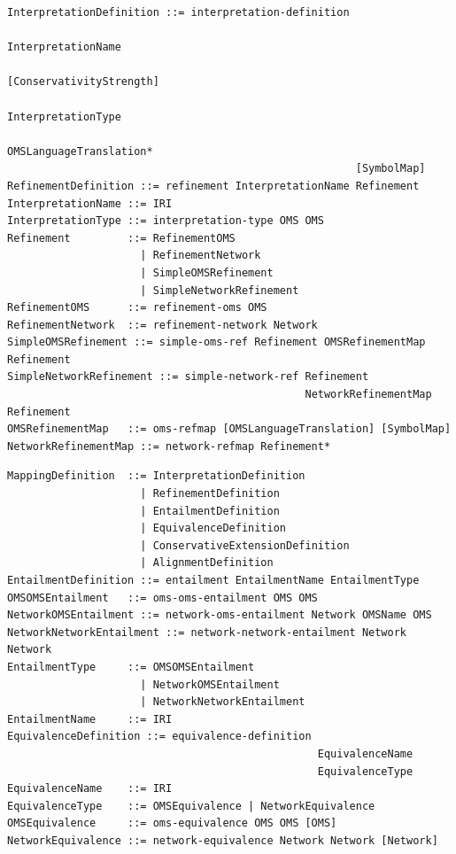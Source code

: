 \documentclass[10pt, a4paper]{isov2}
\begin{document}


\begin{lstlisting}[language=ebnf,escapeinside={<>},mathescape]  % abstract syntax
InterpretationDefinition ::= interpretation-definition
                                                       InterpretationName
                                                       [ConservativityStrength]
                                                       InterpretationType
                                                       OMSLanguageTranslation*
                                                       [SymbolMap]
RefinementDefinition ::= refinement InterpretationName Refinement
InterpretationName ::= IRI
InterpretationType ::= interpretation-type OMS OMS
Refinement         ::= RefinementOMS
                     | RefinementNetwork
                     | SimpleOMSRefinement
                     | SimpleNetworkRefinement
RefinementOMS      ::= refinement-oms OMS
RefinementNetwork  ::= refinement-network Network
SimpleOMSRefinement ::= simple-oms-ref Refinement OMSRefinementMap Refinement
SimpleNetworkRefinement ::= simple-network-ref Refinement
                                               NetworkRefinementMap Refinement
OMSRefinementMap   ::= oms-refmap [OMSLanguageTranslation] [SymbolMap]
NetworkRefinementMap ::= network-refmap Refinement*
\end{lstlisting}

\begin{lstlisting}[language=ebnf,escapeinside={<>},mathescape]  % abstract syntax
MappingDefinition  ::= InterpretationDefinition
                     | RefinementDefinition
                     | EntailmentDefinition
                     | EquivalenceDefinition
                     | ConservativeExtensionDefinition
                     | AlignmentDefinition
EntailmentDefinition ::= entailment EntailmentName EntailmentType
OMSOMSEntailment   ::= oms-oms-entailment OMS OMS
NetworkOMSEntailment ::= network-oms-entailment Network OMSName OMS
NetworkNetworkEntailment ::= network-network-entailment Network Network
EntailmentType     ::= OMSOMSEntailment
                     | NetworkOMSEntailment
                     | NetworkNetworkEntailment
EntailmentName     ::= IRI
EquivalenceDefinition ::= equivalence-definition
                                                 EquivalenceName
                                                 EquivalenceType
EquivalenceName    ::= IRI
EquivalenceType    ::= OMSEquivalence | NetworkEquivalence
OMSEquivalence     ::= oms-equivalence OMS OMS [OMS]
NetworkEquivalence ::= network-equivalence Network Network [Network]
\end{lstlisting}
\end{document}
